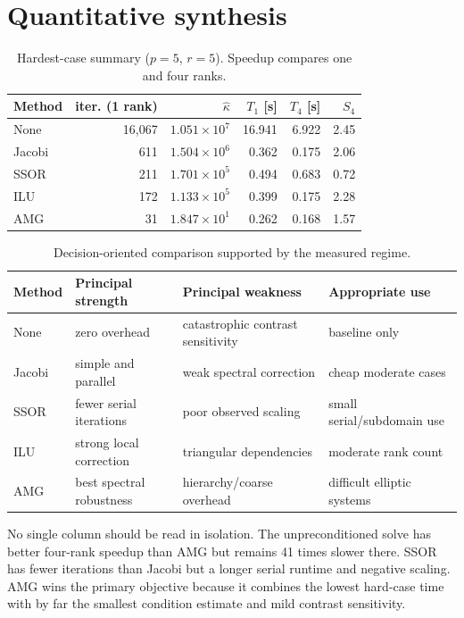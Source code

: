 \documentclass[10pt,a4paper]{article}
\begin{document}
\section{Quantitative synthesis}
\begin{table}[h]
\centering
\caption{Hardest-case summary ($p=5$, $r=5$). Speedup compares one and four ranks.}
\small
\begin{tabular}{lrrrrr}
\toprule
Method & iter. (1 rank) & $\widehat\kappa$ & $T_1$ [s] & $T_4$ [s] & $S_4$\\
\midrule
None   & 16,067 & $1.051\times10^7$ & 16.941 & 6.922 & 2.45\\
Jacobi & 611    & $1.504\times10^6$ & 0.362  & 0.175 & 2.06\\
SSOR   & 211    & $1.701\times10^5$ & 0.494  & 0.683 & 0.72\\
ILU    & 172    & $1.133\times10^5$ & 0.399  & 0.175 & 2.28\\
AMG    & 31     & $1.847\times10^1$ & 0.262  & 0.168 & 1.57\\
\bottomrule
\end{tabular}
\label{tab:synthesis}
\end{table}

\begin{table}[h]
\centering
\caption{Decision-oriented comparison supported by the measured regime.}
\begin{tabularx}{\textwidth}{lXXX}
\toprule
Method & Principal strength & Principal weakness & Appropriate use\\
\midrule
None & zero overhead & catastrophic contrast sensitivity & baseline only\\
Jacobi & simple and parallel & weak spectral correction & cheap moderate cases\\
SSOR & fewer serial iterations & poor observed scaling & small serial/subdomain use\\
ILU & strong local correction & triangular dependencies & moderate rank count\\
AMG & best spectral robustness & hierarchy/coarse overhead & difficult elliptic systems\\
\bottomrule
\end{tabularx}
\end{table}

No single column should be read in isolation. The unpreconditioned solve has better four-rank
speedup than AMG but remains 41 times slower there. SSOR has fewer iterations than Jacobi but a
longer serial runtime and negative scaling. AMG wins the primary objective because it combines the
lowest hard-case time with by far the smallest condition estimate and mild contrast sensitivity.
\end{document}
